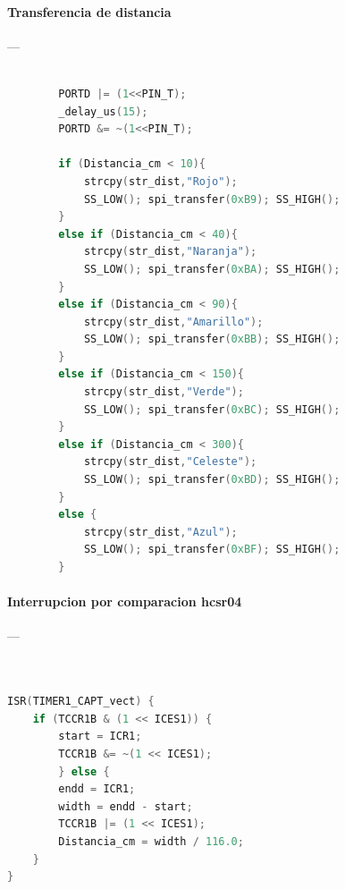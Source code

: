 \paragraph{Transferencia de distancia}\label{anexo:distancia}---
\begin{lstlisting}[language=C, caption={Transferencia distancia}]

		PORTD |= (1<<PIN_T);
		_delay_us(15);
		PORTD &= ~(1<<PIN_T);

		if (Distancia_cm < 10){
			strcpy(str_dist,"Rojo");
			SS_LOW(); spi_transfer(0xB9); SS_HIGH();
		}
		else if (Distancia_cm < 40){
			strcpy(str_dist,"Naranja");
			SS_LOW(); spi_transfer(0xBA); SS_HIGH();
		}
		else if (Distancia_cm < 90){
			strcpy(str_dist,"Amarillo");
			SS_LOW(); spi_transfer(0xBB); SS_HIGH();
		}
		else if (Distancia_cm < 150){
			strcpy(str_dist,"Verde");
			SS_LOW(); spi_transfer(0xBC); SS_HIGH();
		}
		else if (Distancia_cm < 300){
			strcpy(str_dist,"Celeste");
			SS_LOW(); spi_transfer(0xBD); SS_HIGH();
		}
		else {
			strcpy(str_dist,"Azul");
			SS_LOW(); spi_transfer(0xBF); SS_HIGH();
		}


\end{lstlisting}


\paragraph{Interrupcion por comparacion hcsr04}\label{anexo:hcsr04}---
\begin{lstlisting}[language=C, caption={hcsr04}]


ISR(TIMER1_CAPT_vect) {
	if (TCCR1B & (1 << ICES1)) {
		start = ICR1;
		TCCR1B &= ~(1 << ICES1);
		} else {
		endd = ICR1;
		width = endd - start;
		TCCR1B |= (1 << ICES1);
		Distancia_cm = width / 116.0;
	}
}

\end{lstlisting}

